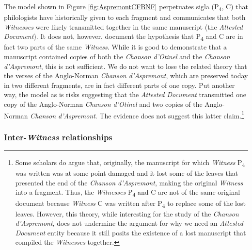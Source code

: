 The model shown in Figure \ref{fig:AspremontCFBNF} perpetuates sigla (P\textsubscript{4}, C) that philologists have historically given to each fragment and communicates that both \textit{Witnesses} were likely transmitted together in the same manuscript (the \textit{Attested Document}). It does not, however, document the hypothesis that P\textsubscript{4} and C are in fact two parts of the same \textit{Witness}. While it is good to demonstrate that a manuscript contained copies of both the \textit{Chanson d'Otinel} and the \textit{Chanson d'Aspremont}, this is not sufficient. We do not want to lose the related theory that the verses of the Anglo-Norman \textit{Chanson d'Aspremont}, which are preserved today in two different fragments, are in fact different parts of one copy. Put another way, the model as is risks suggesting that the \textit{Attested Document} transmitted one copy of the Anglo-Norman \textit{Chanson d'Otinel} and two copies of the Anglo-Norman \textit{Chanson d'Aspremont}. The evidence does not suggest this latter claim.\footnote{Some scholars do argue that, originally, the manuscript for which \textit{Witness} P\textsubscript{4} was written was at some point damaged and it lost some of the leaves that presented the end of the \textit{Chanson d'Aspremont}, making the original \textit{Witness} into a fragment. Thus, the \textit{Witnesses} P\textsubscript{4} and C are not of the same original document because \textit{Witness} C was written after P\textsubscript{4} to replace some of the lost leaves. However, this theory, while interesting for the study of the \textit{Chanson d'Aspremont}, does not undermine the argument for why we need an \textit{Attested Document} entity because it still posits the existence of a lost manuscript that compiled the \textit{Witnesses} together.}

\subsubsection{Inter-\textit{Witness} relationships}


